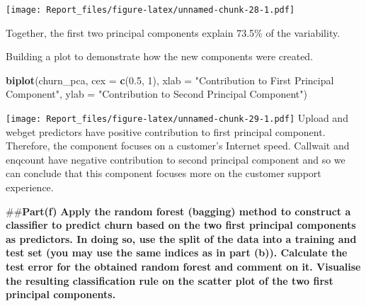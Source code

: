 \documentclass[
]{article}
\newenvironment{Shaded}{\begin{snugshade}}{\end{snugshade}}
\newcommand{\DataTypeTok}[1]{\textcolor[rgb]{0.13,0.29,0.53}{#1}}
\newcommand{\DecValTok}[1]{\textcolor[rgb]{0.00,0.00,0.81}{#1}}
\newcommand{\FloatTok}[1]{\textcolor[rgb]{0.00,0.00,0.81}{#1}}
\newcommand{\KeywordTok}[1]{\textcolor[rgb]{0.13,0.29,0.53}{\textbf{#1}}}
\newcommand{\NormalTok}[1]{#1}
\newcommand{\OperatorTok}[1]{\textcolor[rgb]{0.81,0.36,0.00}{\textbf{#1}}}
\newcommand{\StringTok}[1]{\textcolor[rgb]{0.31,0.60,0.02}{#1}}
\begin{document}
\begin{Shaded}
\end{Shaded}

\texttt{[image: Report\_files/figure-latex/unnamed-chunk-28-1.pdf]}

Together, the first two principal components explain 73.5\% of the
variability.

Building a plot to demonstrate how the new components were created.

\begin{Shaded}
\begin{Highlighting}[]
\KeywordTok{biplot}\NormalTok{(churn_pca, }\DataTypeTok{cex =} \KeywordTok{c}\NormalTok{(}\FloatTok{0.5}\NormalTok{, }\DecValTok{1}\NormalTok{),}
       \DataTypeTok{xlab =} \StringTok{"Contribution to First Principal Component"}\NormalTok{,}
       \DataTypeTok{ylab =} \StringTok{"Contribution to Second Principal Component"}\NormalTok{)}
\end{Highlighting}
\end{Shaded}

\texttt{[image: Report\_files/figure-latex/unnamed-chunk-29-1.pdf]}
Upload and webget predictors have positive contribution to first
principal component. Therefore, the component focuses on a customer's
Internet speed. Callwait and enqcount have negative contribution to
second principal component and so we can conclude that this component
focuses more on the customer support experience.

\#\#\textbf{Part(f)} \textbf{Apply the random forest (bagging) method to
construct a classifier to predict churn based on the two first principal
components as predictors. In doing so, use the split of the data into a
training and test set (you may use the same indices as in part (b)).
Calculate the test error for the obtained random forest and comment on
it. Visualise the resulting classification rule on the scatter plot of
the two first principal components.}
\end{document}
